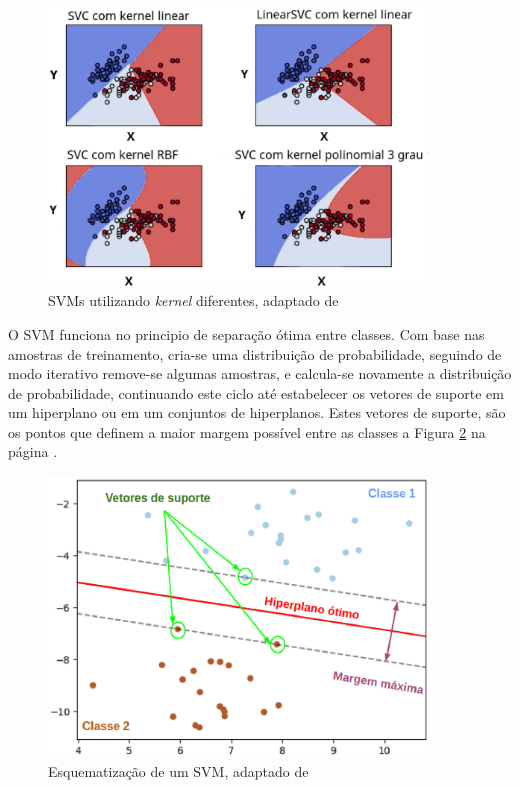\begin{figure}[!htb]
    \centering
     \includegraphics[width=0.9\textwidth]{figuras/svmkernel.eps}
     \caption{SVMs utilizando \textit{kernel} diferentes, adaptado de }
     \label{svmkernel}
 \end{figure}

 O SVM funciona no principio de separação ótima entre classes. Com base nas amostras de treinamento, cria-se uma distribuição de probabilidade, seguindo de modo iterativo remove-se algumas amostras, e calcula-se novamente a distribuição de probabilidade, continuando este ciclo até estabelecer os vetores de suporte em um hiperplano ou em um conjuntos de hiperplanos. Estes vetores de suporte, são os pontos que definem a maior margem possível entre as classes a Figura \ref{svm_hiperplano} na página \pageref{svm_hiperplano} \cite{huang2002assessment}.

 \begin{figure}[!htb]
     \centering
     \includegraphics[width=0.9\textwidth]{figuras/svm_hiperplano.eps}
     \caption{Esquematização de um SVM, adaptado de }
     \label{svm_hiperplano}
 \end{figure}
 
